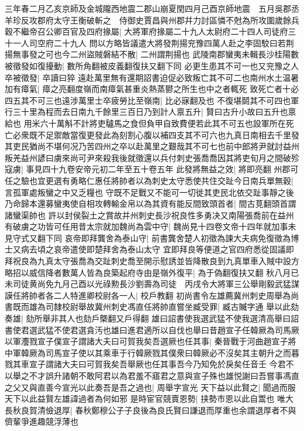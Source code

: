 三年春二月乙亥京師及金城隴西地震二郡山崩夏閏四月己酉京師地震　五月吳郡丞羊珍反攻郡府太守王衡破斬之　侍御史賈昌與州郡幷力討區憐不尅為所攻圍歲餘兵穀不繼帝召公卿百官及四府掾屬|{
	大將軍府掾屬二十九人太尉府二十四人司徒府三十一人司空府二十九人}
問以方略皆議遣大將發荆揚兖豫四萬人赴之李固駮曰若荆揚無事發之可也今二州盜賊磐結不散|{
	二州謂荆揚也}
武陵南郡蠻夷未輯長沙桂陽數被徵發如復擾動|{
	數所角翻被皮義翻復扶又翻下同}
必更生患其不可一也又兖豫之人卒被徵發|{
	卒讀曰猝}
遠赴萬里無有還期詔書迫促必致叛亡其不可二也南州水土温暑加有瘴氣|{
	瘴之亮翻度嶺而南瘴氣甚重炎熱蒸鬰之所生也中之者輒死}
致死亡者十必四五其不可三也遠涉萬里士卒疲勞比至嶺南|{
	比必寐翻及也}
不復堪鬬其不可四也軍行三十里為程而去日南九千餘里三百日乃到計人禀五升|{
	賢曰古升小故曰五升也禀給也}
用米六十萬斛不計將吏驢馬之食但負甲自致費便若此其不可五也設軍所在死亡必衆既不足禦敵當復更發此為刻割心腹以補四支其不可六也九真日南相去千里發其吏民猶尚不堪何况乃苦四州之卒以赴萬里之艱哉其不可七也前中郎將尹就討益州叛羌益州諺曰虜來尚可尹來殺我後就徵還以兵付刺史張喬喬因其將吏旬月之間破殄寇虜|{
	事見四十九卷安帝元初二年至五十卷五年}
此發將無益之效|{
	將即亮翻}
州郡可任之驗也宜更選有勇略仁惠任將帥者以為刺史太守悉使共住交趾今日南兵單無穀|{
	言孤軍處叛蠻之中又乏糧也}
守既不足戰又不能可一切徙其吏民北依交趾事靜之後乃命歸本還募蠻夷使自相攻轉輸金帛以為其資有能反間致頭首者|{
	間古莧翻頭首謂諸蠻渠帥也}
許以封侯裂土之賞故并州刺史長沙祝良性多勇决又南陽張喬前在益州有破虜之功皆可任用昔太宗就加魏尚為雲中守|{
	魏尚見十四卷文帝十四年就加事未見守式又翻下同}
哀帝即拜龔舍為泰山守|{
	前書龔舍楚人初徵為諫大夫病免復徵為博士又病去頃之哀帝遣使即楚拜舍為泰山太守}
宜即拜良等便道之官四府悉從固議即拜祝良為九真太守張喬為交趾刺史喬至開示慰誘並皆降散良到九真單車入賊中設方略招以威信降者數萬人皆為良築起府寺由是嶺外復平|{
	為于偽翻復扶又翻}
秋八月已未司徒黄尚免九月己酉以光祿勲長沙劉壽為司徒　丙戌令大將軍三公舉剛毅武猛謀謨任將帥者各二人特進卿校尉各一人|{
	校戶教翻}
初尚書令左雄薦冀州刺史周舉為尚書既而雄為司隸校尉舉故冀州刺史馮直任將帥直嘗坐臧受罪|{
	臧古贓字通}
舉以此劾奏雄|{
	劾所舉非其人也劾戶槩翻又戶得翻}
雄曰詔書使我選武猛不使我選清高舉曰詔書使君選武猛不使君選貪汚也雄曰進君適所以自伐也舉曰昔趙宣子任韓厥為司馬厥以軍灋戮宣子僕宣子謂諸大夫曰可賀我矣吾選厥也任其事|{
	秦晉戰于河曲趙宣子將中軍韓厥為司馬宣子使以其乘車于行韓厥戮其僕衆曰韓厥必不沒矣其主朝升之而暮戮其車宣子謂諸大夫曰可賀我矣吾舉厥也任其事吾今乃知免於戾矣任音壬}
今君不以舉之不才誤升諸朝不敢阿君以為君羞不寤君之意與宣子殊也雄悦謝曰吾嘗事馮直之父又與直善今宣光以此奏吾是吾之過也|{
	周舉字宣光}
天下益以此賢之|{
	聞過而服天下以此益賢左雄諱過者為何如邪}
是時宦官競賣恩勢|{
	挟勢市恩以此自鬻也}
唯大長秋良賀清儉退厚|{
	春秋鄭穆公子子良後為良氏賢曰謙退而厚重也余謂退厚者不與儕輩爭進趣競浮薄也}

